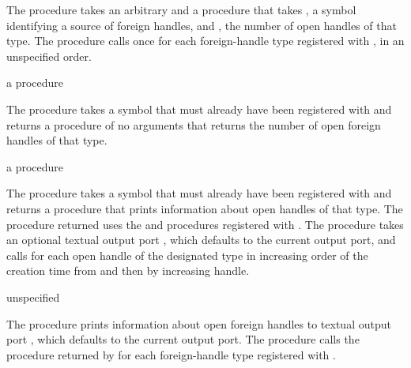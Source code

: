 The  procedure takes an arbitrary  and a
procedure  that takes , a symbol 
identifying a source of foreign handles, and , the number of
open handles of that type.
The  procedure calls  once for
each foreign-handle type registered with ,
in an unspecified order.

\begin{procedure}
\end{procedure}
\returns{} a procedure

The  procedure takes a symbol  that
must already have been registered with 
and returns a procedure of no arguments that returns the number of open foreign
handles of that type.

\begin{procedure}
\end{procedure}
\returns{} a procedure

The  procedure takes a symbol  that
must already have been registered with  and
returns a procedure that prints information about open handles of that type.
The procedure returned uses the  and 
procedures registered with .
The procedure takes an optional textual output port , which defaults
to the current output port, and calls  for each open handle of the
designated type in increasing order of the creation time from 
and then by increasing handle.

\begin{procedure}
\end{procedure}
\returns{} unspecified

The  procedure prints information about open
foreign handles to textual output port , which defaults to the current
output port.
The  procedure
calls the procedure returned by 
for each foreign-handle type registered with .

